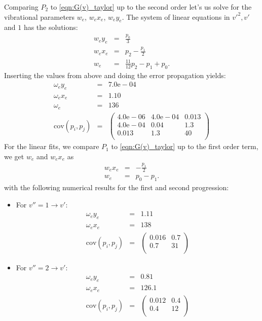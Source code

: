 Comparing $P_2$ to \eqref{eqn:G(v)_taylor} up to the second order let's us solve for 
the vibrational parameters $w_e$, $w_e x_e$, $w_e y_e$. The system of linear equations in 
${v'}^2, v'$ and $1$ has the solutions:
\begin{eqnarray}
    w_e y_e &=& \frac{p_0}{3} \\
    w_e x_e &=& p_2 - \frac{p_1}{2} \\
    w_e &=& \frac{11}{12}p_2 - p_1 + p_0.
\end{eqnarray}
Inserting the values from above and doing the error propagation yields:
\begin{eqnarray}
    \omega_e y_e &=& 7.0\mathrm{e}-04 \\
    \omega_e x_e &=&1.10 \\
    \omega_e &=& 136 \\
    \mathrm{cov}(p_i, p_j) &=& 
    \begin{pmatrix}
        4.0\mathrm{e}-06 &4.0\mathrm{e}-04 &0.013 \\
        4.0\mathrm{e}-04 &0.04 &1.3 \\
        0.013 &1.3 & 40 \\
    \end{pmatrix}
\end{eqnarray}
For the linear fits, we compare $P_1$ to \eqref{eqn:G(v)_taylor} up to the first order 
term, we get $w_e$ and $w_e x_e$ as 
\begin{eqnarray}
    w_e x_e &=& -\frac{p_1}{2} \\
    w_e &=& p_0 - p_1.
\end{eqnarray}
with the following numerical results for the first and second progression: 
\begin{itemize}
    \item For $v'' = 1 \rightarrow v'$:
        \begin{eqnarray}
            \omega_e y_e &=&1.11 \\
            \omega_e x_e &=& 138 \\
            \mathrm{cov}(p_i, p_j) &=& 
            \begin{pmatrix}
                0.016 &0.7 \\
                0.7 & 31 \\
            \end{pmatrix}
        \end{eqnarray}
    \item For $v'' = 2 \rightarrow v'$:
        \begin{eqnarray}
            \omega_e y_e &=&0.81 \\
            \omega_e x_e &=&126.1 \\
            \mathrm{cov}(p_i, p_j) &=& 
            \begin{pmatrix}
                0.012 &0.4 \\
                0.4 & 12 \\
            \end{pmatrix}
        \end{eqnarray}
\end{itemize}

